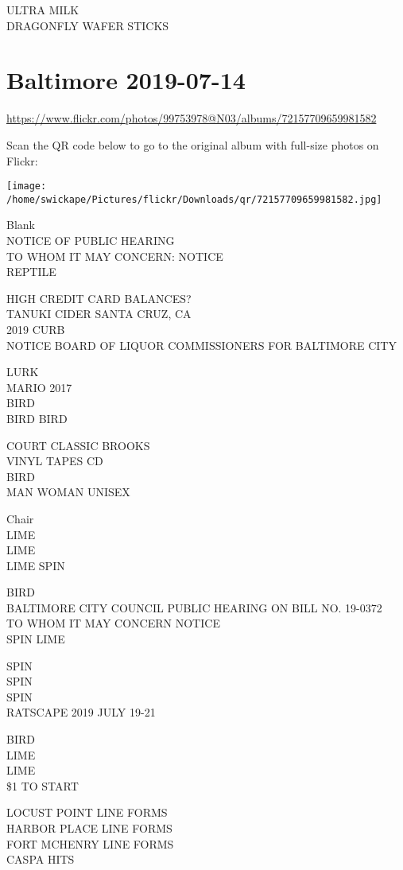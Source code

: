 \documentclass[10pt,letterpaper]{article}
\begin{document}
ULTRA MILK\\
DRAGONFLY WAFER STICKS
\pagebreak

\section*{Baltimore 2019-07-14}

\url{https://www.flickr.com/photos/99753978@N03/albums/72157709659981582}

Scan the QR code below to go to the original album with full-size photos on Flickr:

\texttt{[image: /home/swickape/Pictures/flickr/Downloads/qr/72157709659981582.jpg]}
\pagebreak

Blank\\
NOTICE OF PUBLIC HEARING\\
TO WHOM IT MAY CONCERN: NOTICE\\
REPTILE

HIGH CREDIT CARD BALANCES?\\
TANUKI CIDER SANTA CRUZ, CA\\
2019 CURB\\
NOTICE BOARD OF LIQUOR COMMISSIONERS FOR BALTIMORE CITY

LURK\\
MARIO 2017\\
BIRD\\
BIRD BIRD

COURT CLASSIC BROOKS\\
VINYL TAPES CD\\
BIRD\\
MAN WOMAN UNISEX

Chair\\
LIME\\
LIME\\
LIME SPIN

BIRD\\
BALTIMORE CITY COUNCIL PUBLIC HEARING ON BILL NO. 19{-}0372\\
TO WHOM IT MAY CONCERN NOTICE\\
SPIN LIME

SPIN\\
SPIN\\
SPIN\\
RATSCAPE 2019 JULY 19{-}21

BIRD\\
LIME\\
LIME\\
\$1 TO START

LOCUST POINT LINE FORMS\\
HARBOR PLACE LINE FORMS\\
FORT MCHENRY LINE FORMS\\
CASPA HITS
\end{document}
